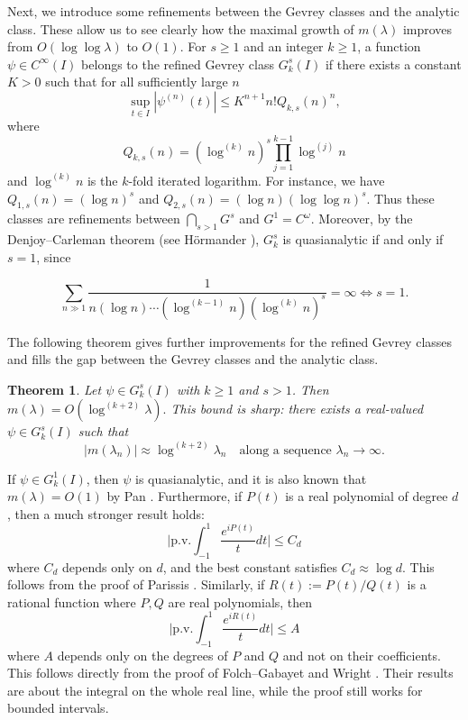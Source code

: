 \documentclass[11pt]{amsart}
\newtheorem{theorem}{Theorem}[section]
\newcommand{\la}{\lambda}
\newcommand{\1}{{\rm 1\hspace*{-0.4ex}%
			\rule{0.1ex}{1.52ex}\hspace*{0.2ex}}}
\numberwithin{equation}{section}
\begin{document}
Next, we introduce some refinements between the Gevrey classes and the analytic class. These allow us to see clearly how the maximal growth of $m(\la)$ improves from $O(\log\log\la)$ to $O(1)$. For $s\ge 1$ and an integer $k\ge 1$, a function $\psi\in C^\infty(I)$ belongs to the refined Gevrey class
$G_k^s(I)$ if there exists a constant $K>0$ such that for all sufficiently large $n$
\[
\sup_{t\in I} |\psi^{(n)}(t)|
\le K^{n+1} n!Q_{k,s}(n)^{n},
\]
where
\[
Q_{k,s}(n)=(\log^{(k)} n)^s\prod_{j=1}^{k-1}\log^{(j)} n
\]
and $\log^{(k)} n$ is the $k$-fold iterated logarithm. For instance, we have $Q_{1,s}(n)=(\log n)^s$ and $Q_{2,s}(n)=(\log n)(\log\log n)^s$. Thus these classes are refinements between $\bigcap_{s>1}G^{s}$ and $G^1=C^\omega$. Moreover, by the Denjoy--Carleman theorem (see H\"ormander \cite[Theorem 1.3.8]{hor1}), $G_k^s$ is quasianalytic if and only if $s=1$, since

\[
\sum_{n\gg 1}\frac{1}{n(\log n)\cdots(\log^{(k-1)}n)(\log^{(k)} n)^s}=\infty \iff s=1.
\]

The following theorem gives further improvements for the refined Gevrey classes and fills the gap between the Gevrey classes and the analytic class.

\begin{theorem}\label{thm:main2}
	 Let $\psi\in G_k^s(I)$ with $k\ge1$ and $s>1$. Then $m(\lambda)=O(\log^{(k+2)}\lambda).$
	This bound is sharp: there exists a real-valued $\psi\in G_k^s(I)$ such that
	\[
	|m(\lambda_n)| \approx \log^{(k+2)} \lambda_n
	\quad\text{along a sequence }\lambda_n\to\infty.
	\]
\end{theorem}

 If $\psi\in G_k^1(I)$, then $\psi$ is quasianalytic, and it is also known that $m(\lambda)=O(1)$ by Pan \cite{pan93}. Furthermore, if $P(t)$ is a real polynomial of degree $d$, then a much stronger result holds:
\begin{equation}\label{pbd}
	\Big|\mathrm{p.v.}\int_{-1}^1\frac{e^{i P(t)}}{t}dt\Big|\le C_d
\end{equation}
 where $C_d$ depends only on $d$, and the best constant satisfies $C_d\approx \log d$. This follows from the proof of Parissis \cite[(3.7), (4.4)]{pa08}. Similarly, if $R(t):=P(t)/Q(t)$ is a rational function where $P,Q$ are real polynomials, then 
 \begin{equation}\label{rbd}
 	\Big|\mathrm{p.v.}\int_{-1}^1\frac{e^{i R(t)}}{t}dt\Big|\le A
 \end{equation}
where $A$ depends only on the degrees of $P$ and $Q$ and not on their coefficients. This follows directly from the proof of Folch--Gabayet and Wright \cite[Theorem 1.1]{fw03}. Their results are about the integral on the whole real line, while the proof still works for bounded intervals.
\end{document}
